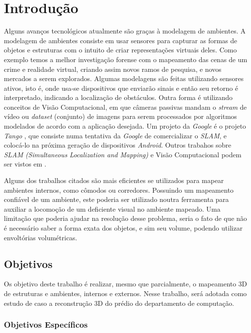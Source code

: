 \chapter{Introdução}

Alguns avanços tecnológicos atualmente são graças à modelagem de ambientes. A modelagem de ambientes consiste em usar sensores para capturar as formas de objetos e estruturas com o intuito de criar representações virtuais deles. Como exemplo temos a melhor investigação forense com o mapeamento das cenas de um crime \cite{FIT3D} e realidade virtual, criando assim novos ramos de pesquisa, e novos mercados a serem explorados. Algumas modelagens são feitas utilizando sensores ativos, isto é, onde usa-se dispositivos que enviarão sinais e então seu retorno é interpretado, indicando a localização de obstáculos. Outra forma é utilizando conceitos de Visão Computacional, em que câmeras passivas mandam o \textit{stream} de vídeo ou \textit{dataset} (conjunto) de imagens para serem processados por algoritmos modelados de acordo com a aplicação desejada. Um projeto da \textit{Google} é o projeto \textit{Tango} \cite{Tango}, que consiste numa tentativa da \textit{Google} de comercializar o \textit{SLAM}, e colocá-lo na próxima geração de dispositivos \textit{Android}. Outros trabahos sobre \textit{SLAM (Simultaneous Localization and Mapping)} e Visão Computacional podem ser vistos em \cite{Trabalhos-Geral-SLAM}.

Alguns dos trabalhos citados são mais eficientes se utilizados para mapear ambientes internos, como cômodos ou
corredores. Possuindo um mapeamento confiável de um ambiente, este poderia ser utilizado noutra ferramenta
para auxiliar a locomoção de um deficiente visual no ambiente mapeado. Uma limitação que poderia ajudar na resolução desse problema, seria o fato de que não é necessário saber a forma exata dos objetos, e sim seu volume, podendo utilizar envoltórias volumétricas. 

\section{Objetivos}

Os objetivo deste trabalho é realizar, mesmo que parcialmente, o mapeamento 3D de estruturas e ambientes, internos e externos. Nesse trabalho, será adotada como estudo de caso a reconstrução 3D do prédio do departamento de computação.

\subsection{Objetivos Específicos}

